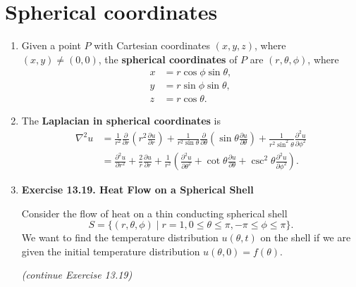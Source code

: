 \newpage

\section{Spherical coordinates}



\begin{enumerate}

\item Given a point $P$ with Cartesian coordinates $(x,y,z)$, where $ (x,y) \neq (0,0)$, the \textbf{spherical coordinates} of $P$ are $(r, \theta, \phi)$, where
    \begin{align*}
        x & = r \cos \phi \sin \theta, \\
        y & = r \sin \phi \sin \theta, \\
        z & = r \cos \theta.
    \end{align*}


\item The \textbf{Laplacian in spherical coordinates} is
    \[
    \begin{aligned}\nabla^{2} u & = \frac{1}{r^{2}}\frac{\partial}{\partial r}\left( r^{2} \frac{\partial u}{\partial r} \right) + \frac{1}{r^{2}\sin \theta} \frac{\partial}{\partial \theta}\left( \sin\theta \frac{\partial u}{\partial \theta} \right) + \frac{1}{r^{2}\sin^{2}\theta} \frac{\partial^{2} u}{\partial \phi^{2}} \\
    & = \frac{\partial^{2} u}{\partial r^{2}} + \frac{2}{r}\frac{\partial u}{\partial r} + \frac{1}{r^{2}}\left( \frac{\partial^{2} u}{\partial \theta^{2}} + \cot \theta \frac{\partial u}{\partial \theta} + \csc^{2}\theta \frac{\partial^{2}u}{\partial \phi^{2}} \right).
    \end{aligned}
    \]



\item \textbf{Exercise 13.19. Heat Flow on a Spherical Shell}

Consider the flow of heat on a thin conducting spherical shell
\[S = \{ (r,\theta, \phi) \mid r = 1, 0 \leq \theta \leq \pi, −\pi \leq \phi \leq \pi \}. \]
We want to find the temperature distribution $u(\theta, t)$ on the shell if we are given the initial temperature distribution $u(\theta, 0) = f (\theta)$.

\newpage \textit{(continue Exercise 13.19)}


\end{enumerate}

